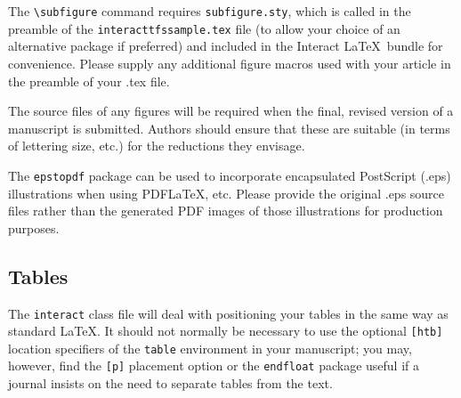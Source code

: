 \documentclass[]{interact}
\theoremstyle{plain}%
\theoremstyle{definition}
\theoremstyle{remark}
\begin{document}
The \verb"\subfigure" command requires \verb"subfigure.sty", which is called in the preamble of the \texttt{interacttfssample.tex} file (to allow your choice of an alternative package if preferred) and included in the \textsf{Interact} \LaTeX\ bundle for convenience. Please supply any additional figure macros used with your article in the preamble of your .tex file.

The source files of any figures will be required when the final, revised version of a manuscript is submitted. Authors should ensure that these are suitable (in terms of lettering size, etc.) for the reductions they envisage.

The \texttt{epstopdf} package can be used to incorporate encapsulated PostScript (.eps) illustrations when using PDF\LaTeX, etc. Please provide the original .eps source files rather than the generated PDF images of those illustrations for production purposes.


\subsection{Tables}

The \texttt{interact} class file will deal with positioning your tables in the same way as standard \LaTeX. It should not normally be necessary to use the optional \texttt{[htb]} location specifiers of the \texttt{table} environment in your manuscript; you may, however, find the \verb"[p]" placement option or the \verb"endfloat" package useful if a journal insists on the need to separate tables from the text.
\end{document}
